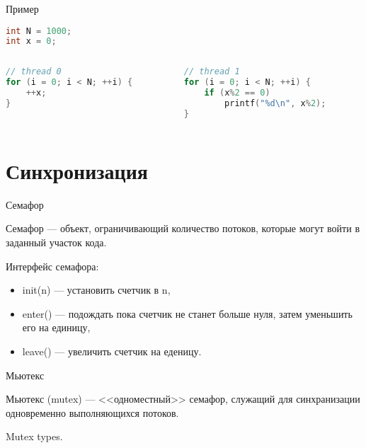 \begin{frame}[fragile]{Пример}

\begin{lstlisting}[language=C++,basicstyle=\ttfamily,keywordstyle=\color{blue},basicstyle=\scriptsize]
int N = 1000;
int x = 0;
\end{lstlisting}

\begin{columns}[t]
    \begin{column}[T]{0.45\textwidth}
    \begin{lstlisting}[language=C++,basicstyle=\ttfamily,keywordstyle=\color{blue},basicstyle=\scriptsize]
// thread 0
for (i = 0; i < N; ++i) {
    ++x;
}
    \end{lstlisting}
    \end{column}
    \begin{column}[T]{0.45\textwidth}
    \begin{lstlisting}[language=C++,basicstyle=\ttfamily,keywordstyle=\color{blue},basicstyle=\scriptsize]
// thread 1
for (i = 0; i < N; ++i) {
    if (x%2 == 0)
        printf("%d\n", x%2);
}
    \end{lstlisting}
    \end{column}
\end{columns}

\end{frame}

\section{Синхронизация}

\begin{frame}{Семафор}

Семафор --- объект, ограничивающий количество потоков, которые могут войти в заданный участок кода.

Интерфейс семафора:

\begin{itemize}
    \item init(n) --- установить счетчик в n,
    \item enter() --- подождать пока счетчик не станет больше нуля, затем уменьшить его на единицу,
    \item leave() --- увеличить счетчик на еденицу.
\end{itemize}

\end{frame}

\begin{frame}{Мьютекс}

Мьютекс (\abbr mutex) --- <<одноместный>> семафор, служащий для синхранизации одновременно выполняющихся потоков.

\todo Mutex types.

\end{frame}

